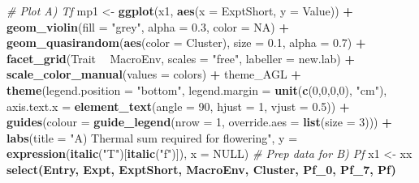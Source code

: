 \documentclass[
]{article}
\newenvironment{Shaded}{\begin{snugshade}}{\end{snugshade}}
\newcommand{\CommentTok}[1]{\textcolor[rgb]{0.56,0.35,0.01}{\textit{#1}}}
\newcommand{\DataTypeTok}[1]{\textcolor[rgb]{0.13,0.29,0.53}{#1}}
\newcommand{\DecValTok}[1]{\textcolor[rgb]{0.00,0.00,0.81}{#1}}
\newcommand{\FloatTok}[1]{\textcolor[rgb]{0.00,0.00,0.81}{#1}}
\newcommand{\KeywordTok}[1]{\textcolor[rgb]{0.13,0.29,0.53}{\textbf{#1}}}
\newcommand{\NormalTok}[1]{#1}
\newcommand{\OperatorTok}[1]{\textcolor[rgb]{0.81,0.36,0.00}{\textbf{#1}}}
\newcommand{\OtherTok}[1]{\textcolor[rgb]{0.56,0.35,0.01}{#1}}
\newcommand{\StringTok}[1]{\textcolor[rgb]{0.31,0.60,0.02}{#1}}
\begin{document}
\begin{Shaded}
\begin{Highlighting}[]
{{{{{{\CommentTok{# Plot A) Tf}
\NormalTok{mp1 <-}\StringTok{ }\KeywordTok{ggplot}\NormalTok{(x1, }\KeywordTok{aes}\NormalTok{(}\DataTypeTok{x =}\NormalTok{ ExptShort, }\DataTypeTok{y =}\NormalTok{ Value)) }\OperatorTok{+}
\StringTok{  }\KeywordTok{geom_violin}\NormalTok{(}\DataTypeTok{fill =} \StringTok{"grey"}\NormalTok{, }\DataTypeTok{alpha =} \FloatTok{0.3}\NormalTok{, }\DataTypeTok{color =} \OtherTok{NA}\NormalTok{) }\OperatorTok{+}\StringTok{ }
\StringTok{  }\KeywordTok{geom_quasirandom}\NormalTok{(}\KeywordTok{aes}\NormalTok{(}\DataTypeTok{color =}\NormalTok{ Cluster), }\DataTypeTok{size =} \FloatTok{0.1}\NormalTok{, }\DataTypeTok{alpha =} \FloatTok{0.7}\NormalTok{) }\OperatorTok{+}\StringTok{ }
\StringTok{  }\KeywordTok{facet_grid}\NormalTok{(Trait }\OperatorTok{~}\StringTok{ }\NormalTok{MacroEnv, }\DataTypeTok{scales =} \StringTok{"free"}\NormalTok{, }\DataTypeTok{labeller =}\NormalTok{ new.lab) }\OperatorTok{+}
\StringTok{  }\KeywordTok{scale_color_manual}\NormalTok{(}\DataTypeTok{values =}\NormalTok{ colors) }\OperatorTok{+}
\StringTok{  }\NormalTok{theme_AGL }\OperatorTok{+}
\StringTok{  }\KeywordTok{theme}\NormalTok{(}\DataTypeTok{legend.position =} \StringTok{"bottom"}\NormalTok{, }\DataTypeTok{legend.margin =} \KeywordTok{unit}\NormalTok{(}\KeywordTok{c}\NormalTok{(}\DecValTok{0}\NormalTok{,}\DecValTok{0}\NormalTok{,}\DecValTok{0}\NormalTok{,}\DecValTok{0}\NormalTok{), }\StringTok{"cm"}\NormalTok{),}
        \DataTypeTok{axis.text.x =} \KeywordTok{element_text}\NormalTok{(}\DataTypeTok{angle =} \DecValTok{90}\NormalTok{, }\DataTypeTok{hjust =} \DecValTok{1}\NormalTok{, }\DataTypeTok{vjust =} \FloatTok{0.5}\NormalTok{)) }\OperatorTok{+}
\StringTok{  }\KeywordTok{guides}\NormalTok{(}\DataTypeTok{colour =} \KeywordTok{guide_legend}\NormalTok{(}\DataTypeTok{nrow =} \DecValTok{1}\NormalTok{, }\DataTypeTok{override.aes =} \KeywordTok{list}\NormalTok{(}\DataTypeTok{size =} \DecValTok{3}\NormalTok{))) }\OperatorTok{+}
\StringTok{  }\KeywordTok{labs}\NormalTok{(}\DataTypeTok{title =} \StringTok{"A) Thermal sum required for flowering"}\NormalTok{, }
       \DataTypeTok{y =} \KeywordTok{expression}\NormalTok{(}\KeywordTok{italic}\NormalTok{(}\StringTok{"T"}\NormalTok{)[}\KeywordTok{italic}\NormalTok{(}\StringTok{"f"}\NormalTok{)]), }\DataTypeTok{x =} \OtherTok{NULL}\NormalTok{)}
\CommentTok{# Prep data for B) Pf}
\NormalTok{x1 <-}\StringTok{ }\NormalTok{xx }\OperatorTok{%
\StringTok{  }\KeywordTok{select}\NormalTok{(Entry, Expt, ExptShort, MacroEnv, Cluster, Pf_}\DecValTok{0}\NormalTok{, Pf_}\DecValTok{7}\NormalTok{, Pf) }\OperatorTok{%
}}}}}}}}
\end{Highlighting}
\end{Shaded}
\end{document}
